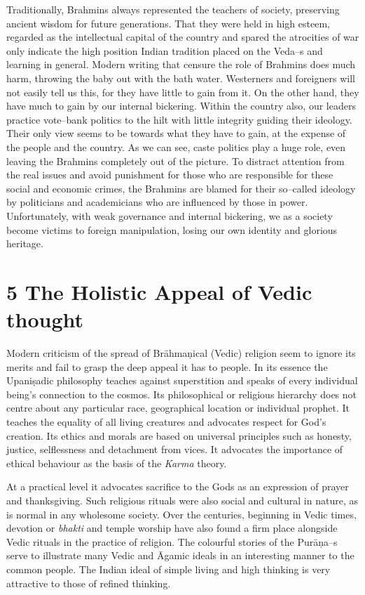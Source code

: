 Traditionally, Brahmins always represented the teachers of society, preserving ancient wisdom for future generations. That they were held in high esteem, regarded as the intellectual capital of the country and spared the atrocities of war only indicate the high position Indian tradition placed on the Veda–s and learning in general. Modern writing that censure the role of Brahmins does much harm, throwing the baby out with the bath water. Westerners and foreigners will not easily tell us this, for they have little to gain from it. On the other hand, they have much to gain by our internal bickering. Within the country also, our leaders practice vote–bank politics to the hilt with little integrity guiding their ideology. Their only view seems to be towards what they have to gain, at the expense of the people and the country. As we can see, caste politics play a huge role, even leaving the Brahmins completely out of the picture. To distract attention from the real issues and avoid punishment for those who are responsible for these social and economic crimes, the Brahmins are blamed for their so–called ideology by politicians and academicians who are influenced by those in power. Unfortunately, with weak governance and internal bickering, we as a society become victims to foreign manipulation, losing our own identity and glorious heritage.


\section*{5 The Holistic Appeal of Vedic thought}

Modern criticism of the spread of Brāhmaņical (Vedic) religion seem to ignore its merits and fail to grasp the deep appeal it has to people. In its essence the Upaniṣadic philosophy teaches against superstition and speaks of every individual being’s connection to the cosmos. Its philosophical or religious hierarchy does not centre about any particular race, geographical location or individual prophet. It teaches the equality of all living creatures and advocates respect for God’s creation. Its ethics and morals are based on universal principles such as honesty, justice, selflessness and detachment from vices. It advocates the importance of ethical behaviour as the basis of the \textit{Karma} theory.

At a practical level it advocates sacrifice to the Gods as an expression of prayer and thanksgiving. Such religious rituals were also social and cultural in nature, as is normal in any wholesome society. Over the centuries, beginning in Vedic times, devotion or \textit{bhakti} and temple worship have also found a firm place alongside Vedic rituals in the practice of religion. The colourful stories of the Purāņa–s serve to illustrate many Vedic and Āgamic ideals in an interesting manner to the common people. The Indian ideal of simple living and high thinking is very attractive to those of refined thinking. 

